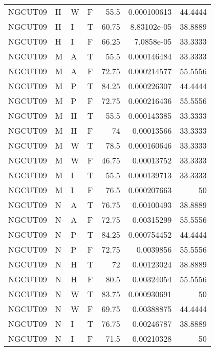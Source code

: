 \begin{table}[htb!]
{\begin{tabular}{llllrrr}
            NGCUT09  & H     & W     & F          & 55.5       & 0.000100613 & 44.4444  \\
            NGCUT09  & H     & I     & T          & 60.75      & 8.83102e-05 & 38.8889  \\
            NGCUT09  & H     & I     & F          & 66.25      & 7.0858e-05  & 33.3333  \\
            NGCUT09  & M     & A     & T          & 55.5       & 0.000146484 & 33.3333  \\
            NGCUT09  & M     & A     & F          & 72.75      & 0.000214577 & 55.5556  \\
            NGCUT09  & M     & P     & T          & 84.25      & 0.000226307 & 44.4444  \\
            NGCUT09  & M     & P     & F          & 72.75      & 0.000216436 & 55.5556  \\
            NGCUT09  & M     & H     & T          & 55.5       & 0.000143385 & 33.3333  \\
            NGCUT09  & M     & H     & F          & 74         & 0.00013566  & 33.3333  \\
            NGCUT09  & M     & W     & T          & 78.5       & 0.000160646 & 33.3333  \\
            NGCUT09  & M     & W     & F          & 46.75      & 0.00013752  & 33.3333  \\
            NGCUT09  & M     & I     & T          & 55.5       & 0.000139713 & 33.3333  \\
            NGCUT09  & M     & I     & F          & 76.5       & 0.000207663 & 50       \\
            NGCUT09  & N     & A     & T          & 76.75      & 0.00100493  & 38.8889  \\
            NGCUT09  & N     & A     & F          & 72.75      & 0.00315299  & 55.5556  \\
            NGCUT09  & N     & P     & T          & 84.25      & 0.000754452 & 44.4444  \\
            NGCUT09  & N     & P     & F          & 72.75      & 0.0039856   & 55.5556  \\
            NGCUT09  & N     & H     & T          & 72         & 0.00123024  & 38.8889  \\
            NGCUT09  & N     & H     & F          & 80.5       & 0.00324054  & 55.5556  \\
            NGCUT09  & N     & W     & T          & 83.75      & 0.000930691 & 50       \\
            NGCUT09  & N     & W     & F          & 69.75      & 0.00388875  & 44.4444  \\
            NGCUT09  & N     & I     & T          & 76.75      & 0.00246787  & 38.8889  \\
            NGCUT09  & N     & I     & F          & 71.5       & 0.00210328  & 50       \\
            \hline
        \end{tabular}
    }{
    }
\end{table} 
